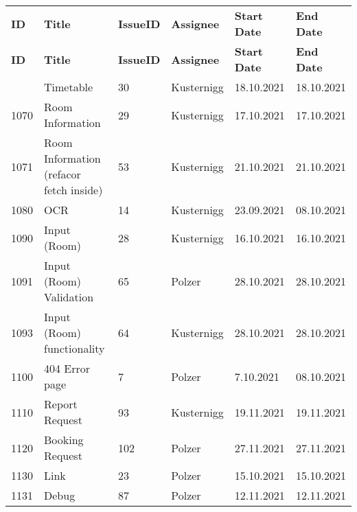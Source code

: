 \begin{longtable}{|p{}|p{}|p{}|p{}|p{}|p{}|} \hline
    \textbf{ID} & \textbf{Title} & \textbf{Issue\-ID} & \textbf{Assignee} & \textbf{Start Date} & \textbf{End \linebreak Date} \\ \hhline{|=|=|=|=|=|=|}
    \endfirsthead
    \hline
    \textbf{ID} & \textbf{Title} & \textbf{Issue\-ID} & \textbf{Assignee} & \textbf{Start Date} & \textbf{End \linebreak Date} \\ \hhline{|=|=|=|=|=|=|}
    \endhead
    1060 & Timetable & 30 & Kusternigg & 18.10.2021 & 18.10.2021 \\ \hline
    1070 & Room Information & 29 & Kusternigg & 17.10.2021 & 17.10.2021 \\ \hline
    1071 & Room Information (refacor fetch inside) & 53 & Kusternigg & 21.10.2021 & 21.10.2021 \\ \hline
    1080 & OCR  & 14 & Kusternigg &  23.09.2021 & 08.10.2021 \\ \hline
    1090 & Input (Room) & 28 & Kusternigg & 16.10.2021 & 16.10.2021 \\ \hline
    1091 & Input (Room) Validation & 65 & Polzer & 28.10.2021 & 28.10.2021 \\ \hline
    1093 & Input (Room) functionality & 64 & Kusternigg & 28.10.2021 & 28.10.2021 \\ \hline
    1100 & 404 Error page & 7 & Polzer & 7.10.2021 & 08.10.2021 \\ \hline
    1110 & Report Request & 93 & Kusternigg & 19.11.2021 & 19.11.2021 \\ \hline
    1120 & Booking Request & 102 & Polzer & 27.11.2021 & 27.11.2021 \\ \hline
    1130 & Link & 23 & Polzer & 15.10.2021 & 15.10.2021 \\ \hline
    1131 & Debug & 87 & Polzer & 12.11.2021 & 12.11.2021 \\ \hline
\end{longtable}


